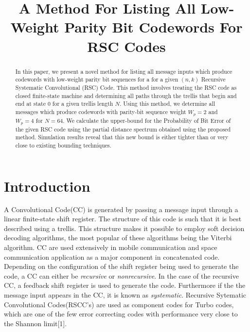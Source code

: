 \documentclass[conference]{IEEEtran}
\begin{document}
	
	\title{A Method For Listing All Low-Weight Parity Bit Codewords For RSC Codes\\
	}
	
	\author{
		\and
	}
	
	\maketitle
	
	\begin{abstract}
In this paper, we present a novel method for listing all message inputs which produce codewords with low-weight parity bit sequences for a for a given $(n,k)$ Recursive Systematic Convolutional (RSC) Code.
This method involves treating  the RSC code as closed finite-state machine and determining all paths through the trellis that begin and end at state 0 for a given trellis length $N$. Using this method, we determine all messages which produce codewords with parity-bit sequence weight $W_p=2$ and $W_p=4$ for $N=64$. We calculate the upper-bound for the Probability of Bit Error  of the given RSC code using the partial distance spectrum obtained using the proposed method. Simulation results reveal that this new bound is either tighter than or very close to existing  bounding techniques.
\end{abstract}

	
	\linespread{2.0}	
\section{Introduction}

A Convolutional Code(CC) is generated by passing a message input through a linear finite-state shift register. The structure of this code is such that it is best described using a trellis. This structure makes it possible to employ soft decision decoding algorithms, the most popular of these algorithms being the Viterbi algorithm. CC are used extensively in mobile communication and space communication application as a major component in concatenated code.  Depending on the configuration of the shift register being used to generate the code, a CC can either be \textit{recursive} or \textit{nonrecursive}. In the case of the recursive CC, a feedback shift register is used to generate the code. Furthermore if the the message input appears in the CC, it is known as \textit{systematic}. Recursive Sytematic Convolutional Codes(RSCC's) are used as component codes for Turbo codes, which are one of the few error correcting codes with performance very close to the Shannon limit[1].
\end{document}

